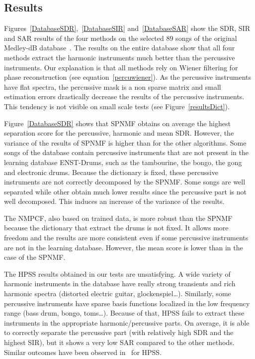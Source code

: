 \subsection{Results} 
\label{subResults}

Figures~\ref{DatabaseSDR},~\ref{DatabaseSIR} and~\ref{DatabaseSAR} show the SDR, SIR and SAR results of the four methods on the selected $89$ songs of the original Medley-dB database~\cite{bittner2014medleydb}. The results on the entire database show that all four methods extract the harmonic instruments much better than the percussive instruments. Our explanation is that all methods rely on Wiener filtering for phase reconstruction (see equation~\ref{percuwiener}). As the percussive instruments have flat spectra, the percussive mask is a non sparse matrix and small estimation errors drastically decrease the results of the percussive instruments. This tendency is not visible on small scale tests (see Figure~\ref{resultsDict}). 

Figure~\ref{DatabaseSDR} shows that SPNMF obtains on average the highest separation score for the percussive, harmonic and mean SDR. However, the variance of the results of SPNMF is higher than for the other algorithms. Some songs of the database contain percussive instruments that are not present in the learning database ENST-Drums, such as the tambourine, the bongo, the gong and electronic drums. Because the dictionary is fixed, these percussive instruments are not correctly decomposed by the SPNMF. Some songs are well separated while other obtain much lower results since the percussive part is not well decomposed. This induces an increase of the variance of the results. 

The NMPCF, also based on trained data, is more robust than the SPNMF because the dictionary that extract the drums is not fixed. It allows more freedom and the results are more consistent even if some percussive instruments are not in the learning database. However, the mean score is lower than in the case of the SPNMF.

The HPSS results obtained in our tests are unsatisfying. A wide variety of harmonic instruments in the database have really strong transients and rich harmonic spectra (distorted electric guitar, glockenspiel\ldots). Similarly, some percussive instruments have sparse basis functions localized in the low frequency range (bass drum, bongo, toms\ldots). Because of that, HPSS fails to extract these instruments in the appropriate harmonic/percussive parts. On average, it is able to correctly separate the percussive part (with relatively high SDR and the highest SIR), but it shows a very low SAR compared to the other methods. Similar outcomes have been observed in~\cite{canadas2014percussive} for HPSS.

